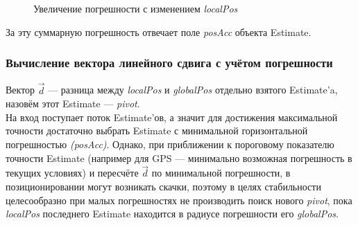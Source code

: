 \documentclass[a4paper, 11pt, titlepage]{article}
\begin{document}
          \begin{figure}[H]
            \centering
            \caption{Увеличение погрешности с изменением \textit{localPos}}
          \end{figure}

          За эту суммарную погрешность отвечает поле \textit{posAcc} объекта Estimate.

        \subsubsection{Вычисление вектора линейного сдвига с учётом погрешности}
          Вектор $\vec{d}$ --- разница между \textit{localPos} и \textit{globalPos} отдельно взятого Estimate'a, назовём этот Estimate --- \textit{pivot}.\\
          На вход поступает поток Estimate'ов, а значит для достижения максимальной точности достаточно выбрать Estimate с минимальной 
          горизонтальной погрешностью \textit{(posAcc)}. Однако, при приближении к пороговому показателю точности Estimate (например для GPS --- минимально
          возможная погрешность в текущих условиях) и пересчёте $\vec{d}$ по минимальной погрешности, в позиционировании могут возникать скачки,
          поэтому в целях стабильности целесообразно при малых погрешностях не производить поиск нового \textit{pivot}, пока \textit{localPos} последнего
          Estimate находится в радиусе погрешности его \textit{globalPos}.
\end{document}
